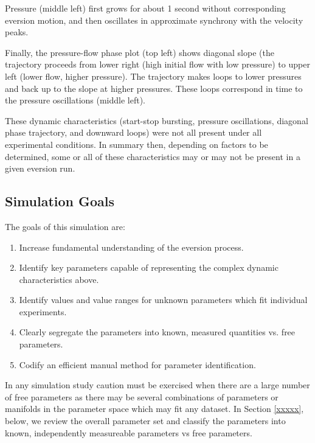 \documentclass[letterpaper]{article}
\begin{document}
Pressure (middle left) first grows for about 1 second without corresponding eversion motion, and
then oscillates in approximate synchrony with the velocity peaks.

Finally, the pressure-flow phase plot (top left) shows diagonal slope (the trajectory proceeds from
lower right (high initial flow with low pressure) to upper left (lower flow, higher pressure).
The trajectory makes loops to lower pressures and back up to the slope at higher pressures.  These
loops correspond in time to the pressure oscillations (middle left).

These dynamic characteristics (start-stop bursting, pressure oscillations, diagonal phase trajectory, and
downward loops) were not all present under all experimental conditions.  In summary then, depending on
factors to be determined, some or all of these characteristics may or may not be present in a given
eversion run.

\subsection{Simulation Goals}
The goals of this simulation are:
\begin{enumerate}
  \item Increase fundamental understanding of the eversion process.
  \item Identify key parameters capable of representing the complex dynamic characteristics above.
  \item Identify values and value ranges for unknown parameters which fit individual experiments.
  \item Clearly segregate the parameters into known, measured quantities vs. free parameters.
  \item Codify an efficient manual method for parameter identification.
\end{enumerate}

In any simulation study caution must be exercised when there are a large number of free parameters
as there may be several combinations of parameters or manifolds in the parameter space which
may fit any dataset.   In Section \ref{xxxxx}, below, we review the overall parameter set and
classify the parameters into known, independently measureable parameters vs free parameters.
\end{document}
